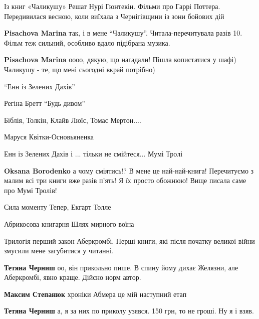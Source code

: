 
Із книг «Чаликушу» Решат Нурі Гюнтекін. Фільми про Гаррі Поттера. Передивилася
весною, коли виїхала з Чернігівщини із зони бойових дій

\begin{itemize} %
\textbf{Pisachova Marina} так, і в мене \enquote{Чаликушу}. Читала-перечитувала разів 10. Фільм теж сильний, особливо вдало підібрана музика.

\textbf{Pisachova Marina} оооо, дякую, що нагадали! Пішла копистатися у шафі) Чаликушу - те, що мені сьогодні вкрай потрібно)
\end{itemize} %


\enquote{Енн із Зелених Дахів}


Регіна Бретт \enquote{Будь дивом}


Біблія, Толкін, Клайв Люїс, Томас Мертон....


Маруся Квітки-Основьяненка


Енн із Зелених Дахів і ... тільки не смійтеся... Мумі Тролі

\begin{itemize} %
\textbf{Oksana Borodenko} а чому сміятись!? В мене це най-най-книга! Перечитуємо з малим всі три книги вже разів п'ять! Я їх просто обожнюю! Вище писала саме про Мумі Тролів!
\end{itemize} %


Сила моменту Тепер, Екгарт Толле


Абрикосова книгарня
Шлях мирного воїна


Трилогія перший закон Аберкромбі. Перші книги, які після початку великої війни
змусили мене загубитися у читанні.

\begin{itemize} %
\textbf{Тетяна Черниш} оо, він прикольно пише. В спину йому дихає Желязни, але Аберкромбі, явно краще. Дійсно норм автор.

\textbf{Максим Степанюк} хроніки Абмера це мій наступний етап

\textbf{Тетяна Черниш} а, я за них по приколу узявся. 150 грн, то не гроші. Ну я і взяв.
\end{itemize} %

